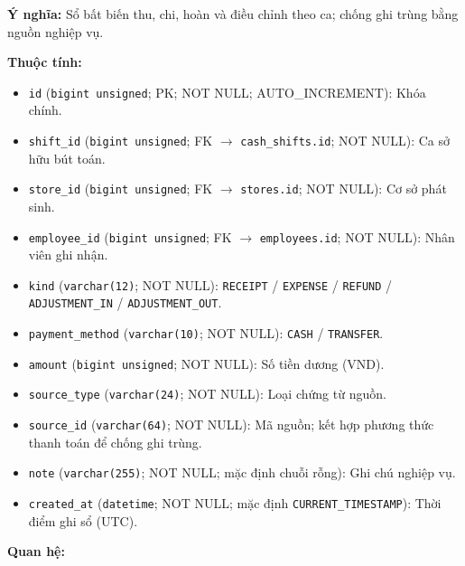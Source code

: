 \textbf{Ý nghĩa:} Sổ bất biến thu, chi, hoàn và điều chỉnh theo ca; chống ghi trùng bằng nguồn nghiệp vụ.\par

\textbf{Thuộc tính:}

\begin{itemize}

\item \texttt{id} (\texttt{bigint unsigned}; PK; NOT NULL; AUTO_INCREMENT): Khóa chính.

\item \texttt{shift\_id} (\texttt{bigint unsigned}; FK $\rightarrow$ \texttt{cash\_shifts.id}; NOT NULL): Ca sở hữu bút toán.

\item \texttt{store\_id} (\texttt{bigint unsigned}; FK $\rightarrow$ \texttt{stores.id}; NOT NULL): Cơ sở phát sinh.

\item \texttt{employee\_id} (\texttt{bigint unsigned}; FK $\rightarrow$ \texttt{employees.id}; NOT NULL): Nhân viên ghi nhận.

\item \texttt{kind} (\texttt{varchar(12)}; NOT NULL): \texttt{RECEIPT} / \texttt{EXPENSE} / \texttt{REFUND} / \texttt{ADJUSTMENT\_IN} / \texttt{ADJUSTMENT\_OUT}.

\item \texttt{payment\_method} (\texttt{varchar(10)}; NOT NULL): \texttt{CASH} / \texttt{TRANSFER}.

\item \texttt{amount} (\texttt{bigint unsigned}; NOT NULL): Số tiền dương (VND).

\item \texttt{source\_type} (\texttt{varchar(24)}; NOT NULL): Loại chứng từ nguồn.

\item \texttt{source\_id} (\texttt{varchar(64)}; NOT NULL): Mã nguồn; kết hợp phương thức thanh toán để chống ghi trùng.

\item \texttt{note} (\texttt{varchar(255)}; NOT NULL; mặc định chuỗi rỗng): Ghi chú nghiệp vụ.

\item \texttt{created\_at} (\texttt{datetime}; NOT NULL; mặc định \texttt{CURRENT\_TIMESTAMP}): Thời điểm ghi sổ (UTC).

\end{itemize}

\textbf{Quan hệ:}

